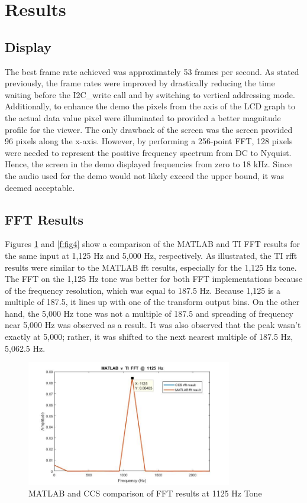 \documentclass[11pt,pdftex,portrait,letterpaper]{article}
\begin{document}
\section{Results}

\subsection{Display}

The best frame rate achieved was approximately 53 frames per second. As stated previously, the frame rates were improved by drastically reducing the time waiting before the I2C\_write call and by switching to vertical addressing mode. Additionally, to enhance the demo the pixels from the axis of the LCD graph to the actual data value pixel were illuminated to provided a better magnitude profile for the viewer. The only drawback of the screen was the screen provided 96 pixels along the x-axis. However, by performing a 256-point FFT, 128 pixels were needed to represent the positive frequency spectrum from DC to Nyquist. Hence, the screen in the demo displayed frequencies from zero to 18 kHz. Since the audio used for the demo would not likely exceed the upper bound, it was deemed acceptable.

\subsection{FFT Results}

Figures \ref{f:fig3} and \ref{f:fig4} show a comparison of the MATLAB and TI FFT results for the same input at 1,125 Hz and 5,000 Hz, respectively. As illustrated, the TI rfft results were similar to the MATLAB fft results, especially for the 1,125 Hz tone. The FFT on the 1,125 Hz tone was better for both FFT implementations because of the frequency resolution, which was equal to 187.5 Hz. Because 1,125 is a multiple of 187.5, it lines up with one of the transform output bins. On the other hand, the 5,000 Hz tone was not a multiple of 187.5 and spreading of frequency near 5,000 Hz was observed as a result. It was also observed that the peak wasn't exactly at 5,000; rather, it was shifted to the next nearest multiple of 187.5 Hz, 5,062.5 Hz.

\begin{figure}[h]
\centering
\includegraphics[width=0.8\textwidth]{./1125Compare}
\caption{MATLAB and CCS comparison of FFT results at 1125 Hz Tone}
\label{f:fig3}
\end{figure}
\end{document}
